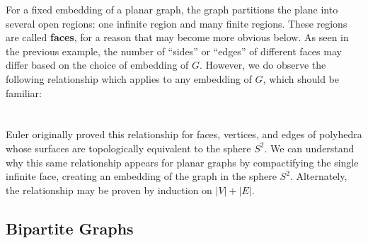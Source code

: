 \documentclass{article}
\begin{document}
	For a fixed embedding of a planar graph, the graph partitions the plane into several open regions: one infinite region and many finite regions. These regions are called \textbf{faces}, for a reason that may become more obvious below. As seen in the previous example, the number of ``sides'' or ``edges'' of different faces may differ based on the choice of embedding of $G$. However, we do observe the following relationship which applies to any embedding of $G$, which should be familiar:\\
	
	\\ \\
	
	Euler originally proved this relationship for faces, vertices, and edges of polyhedra whose surfaces are topologically equivalent to the sphere $S^2$. We can understand why this same relationship appears for planar graphs by compactifying the single infinite face, creating an embedding of the graph in the sphere $S^2$. Alternately, the relationship may be proven by induction on $|V|+|E|$. 
	
	\subsection{Bipartite Graphs}
	
		\\ \\
\end{document}
